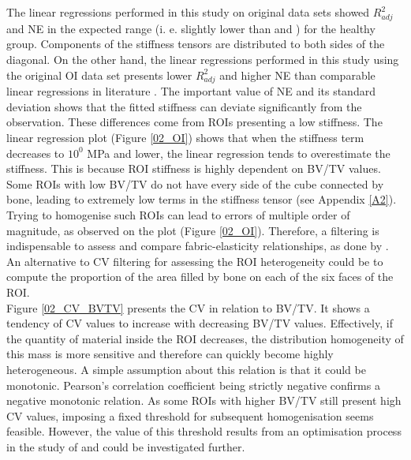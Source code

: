 \documentclass[a4paper,fleqn]{DC_ArtStyle}
\begin{document}
The linear regressions performed in this study on original data sets showed $R^2_{adj}$ and NE in the expected range (i. e. slightly lower than \citeauthor{Gross2013}\cite{Gross2013} and \citeauthor{Panyasantisuk2015}\cite{Panyasantisuk2015}) for the healthy group. Components of the stiffness tensors are distributed to both sides of the diagonal. On the other hand, the linear regressions performed in this study using the original OI data set presents lower $R^2_{adj}$ and higher NE than comparable linear regressions in literature \cite{Gross2013,Panyasantisuk2015}. The important value of NE and its standard deviation shows that the fitted stiffness can deviate significantly from the observation. These differences come from ROIs presenting a low stiffness. The linear regression plot (Figure \ref{02_OI}) shows that when the stiffness term decreases to $10^0$ MPa and lower, the linear regression tends to overestimate the stiffness. This is because ROI stiffness is highly dependent on BV/TV values. Some ROIs with low BV/TV do not have every side of the cube connected by bone, leading to extremely low terms in the stiffness tensor (see Appendix \ref{A2}). Trying to homogenise such ROIs can lead to errors of multiple order of magnitude, as observed on the plot (Figure \ref{02_OI}). Therefore, a filtering is indispensable to assess and compare fabric-elasticity relationships, as done by \citeauthor{Panyasantisuk2015} \cite{Panyasantisuk2015}. An alternative to CV filtering for assessing the ROI heterogeneity could be to compute the proportion of the area filled by bone on each of the six faces of the ROI. \\
Figure \ref{02_CV_BVTV} presents the CV in relation to BV/TV. It shows a tendency of CV values to increase with decreasing BV/TV values. Effectively, if the quantity of material inside the ROI decreases, the distribution homogeneity of this mass is more sensitive and therefore can quickly become highly heterogeneous. A simple assumption about this relation is that it could be monotonic. Pearson's correlation coefficient being strictly negative confirms a negative monotonic relation. As some ROIs with higher BV/TV still present high CV values, imposing a fixed threshold for subsequent homogenisation seems feasible. However, the value of this threshold results from an optimisation process in the study of \citeauthor{Panyasantisuk2015}\cite{Panyasantisuk2015} and could be investigated further. \\
\end{document}
